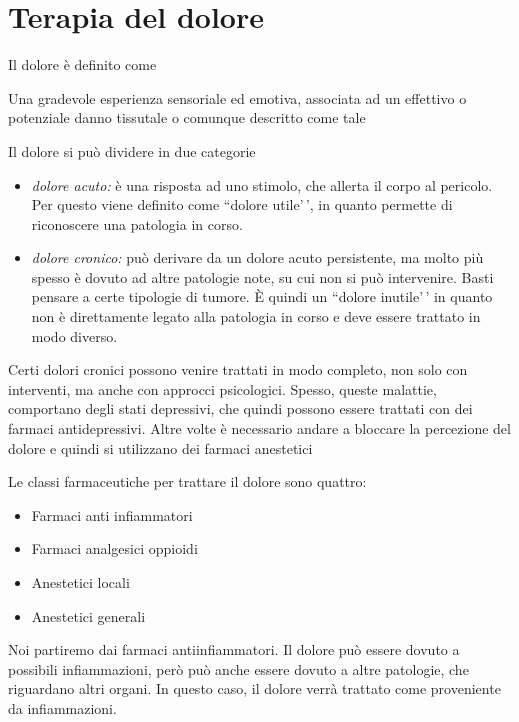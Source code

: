 \chapter{Terapia del dolore}

Il dolore
è definito come

\begin{quoting}
Una gradevole esperienza sensoriale ed emotiva, associata ad un effettivo o potenziale danno tissutale o comunque descritto come tale
\end{quoting}

Il dolore si può dividere in due categorie

\begin{itemize}
\item
\emph{dolore acuto:} è una risposta ad uno stimolo, che allerta il
corpo al pericolo. Per questo viene definito come ``dolore utile'\,',
in quanto permette di riconoscere una patologia in corso.
\item
\emph{dolore cronico:} può derivare da un dolore acuto persistente, ma
molto più spesso è dovuto ad altre patologie note, su cui non si può
intervenire. Basti pensare a certe tipologie di tumore. È quindi un
``dolore inutile'\,' in quanto non è direttamente legato alla
patologia in corso e deve essere trattato in modo diverso.
\end{itemize}

Certi dolori cronici possono venire trattati in modo completo, non solo
con interventi, ma anche con approcci psicologici. Spesso, queste
malattie, comportano degli stati depressivi, che quindi possono essere
trattati con dei farmaci antidepressivi. Altre volte è necessario andare
a bloccare la percezione del dolore e quindi si utilizzano dei farmaci
anestetici

Le classi farmaceutiche per trattare il dolore sono quattro:

\begin{itemize}
\item
Farmaci anti infiammatori
\item
Farmaci analgesici oppioidi
\item
Anestetici locali
\item
Anestetici generali
\end{itemize}

Noi partiremo dai farmaci antiinfiammatori. Il dolore può essere dovuto
a possibili infiammazioni, però può anche essere dovuto a altre
patologie, che riguardano altri organi. In questo caso, il dolore verrà
trattato come proveniente da infiammazioni.

